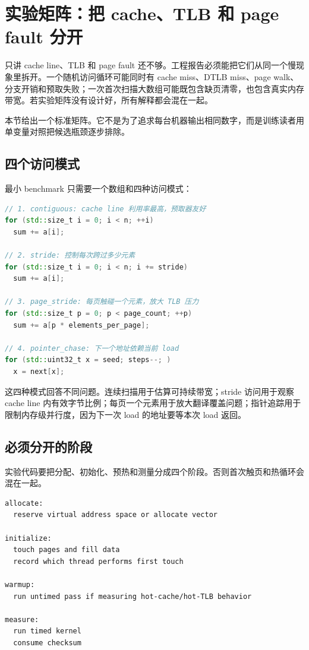 \section{实验矩阵：把 cache、TLB 和 page fault 分开}

只讲 cache line、TLB 和 page fault 还不够。工程报告必须能把它们从同一个慢现象里拆开。一个随机访问循环可能同时有 cache miss、DTLB miss、page walk、分支开销和预取失败；一次首次扫描大数组可能既包含缺页清零，也包含真实内存带宽。若实验矩阵没有设计好，所有解释都会混在一起。

本节给出一个标准矩阵。它不是为了追求每台机器输出相同数字，而是训练读者用单变量对照把候选瓶颈逐步排除。

\subsection{四个访问模式}

最小 benchmark 只需要一个数组和四种访问模式：

\begin{lstlisting}[language=C++,caption={四种地址模式的伪代码}]
// 1. contiguous: cache line 利用率最高，预取器友好
for (std::size_t i = 0; i < n; ++i)
  sum += a[i];

// 2. stride: 控制每次跨过多少元素
for (std::size_t i = 0; i < n; i += stride)
  sum += a[i];

// 3. page_stride: 每页触碰一个元素，放大 TLB 压力
for (std::size_t p = 0; p < page_count; ++p)
  sum += a[p * elements_per_page];

// 4. pointer_chase: 下一个地址依赖当前 load
for (std::uint32_t x = seed; steps--; )
  x = next[x];
\end{lstlisting}

这四种模式回答不同问题。连续扫描用于估算可持续带宽；stride 访问用于观察 cache line 内有效字节比例；每页一个元素用于放大翻译覆盖问题；指针追踪用于限制内存级并行度，因为下一次 load 的地址要等本次 load 返回。

\subsection{必须分开的阶段}

实验代码要把分配、初始化、预热和测量分成四个阶段。否则首次触页和热循环会混在一起。

\begin{lstlisting}[numbers=none,caption={内存实验阶段}]
allocate:
  reserve virtual address space or allocate vector

initialize:
  touch pages and fill data
  record which thread performs first touch

warmup:
  run untimed pass if measuring hot-cache/hot-TLB behavior

measure:
  run timed kernel
  consume checksum
\end{lstlisting}

